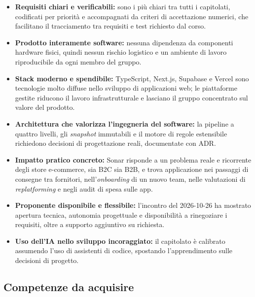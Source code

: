 \begin{itemize}
    \item \textbf{Requisiti chiari e verificabili:} sono i più chiari tra tutti i capitolati, codificati per priorità e accompagnati da criteri di accettazione numerici, che facilitano il tracciamento tra requisiti e test richiesto dal corso.
    \item \textbf{Prodotto interamente software:} nessuna dipendenza da componenti hardware fisici, quindi nessun rischio logistico e un ambiente di lavoro riproducibile da ogni membro del gruppo.
    \item \textbf{Stack moderno e spendibile:} TypeScript, Next.js, Supabase e Vercel sono tecnologie molto diffuse nello sviluppo di applicazioni web; le piattaforme gestite riducono il lavoro infrastrutturale e lasciano il gruppo concentrato sul valore del prodotto.
    \item \textbf{Architettura che valorizza l'ingegneria del software:} la pipeline a quattro livelli, gli \emph{snapshot} immutabili e il motore di regole estensibile richiedono decisioni di progettazione reali, documentate con ADR.
    \item \textbf{Impatto pratico concreto:} Sonar risponde a un problema reale e ricorrente degli store e-commerce, sia B2C sia B2B, e trova applicazione nei passaggi di consegne tra fornitori, nell'\emph{onboarding} di un nuovo team, nelle valutazioni di \emph{replatforming} e negli audit di spesa sulle app.
    \item \textbf{Proponente disponibile e flessibile:} l'incontro del 2026-10-26 ha mostrato apertura tecnica, autonomia progettuale e disponibilità a rinegoziare i requisiti, oltre a supporto aggiuntivo su richiesta.
    \item \textbf{Uso dell'IA nello sviluppo incoraggiato:} il capitolato è calibrato assumendo l'uso di assistenti di codice, spostando l'apprendimento sulle decisioni di progetto.
\end{itemize}

\subsection{Competenze da acquisire}


